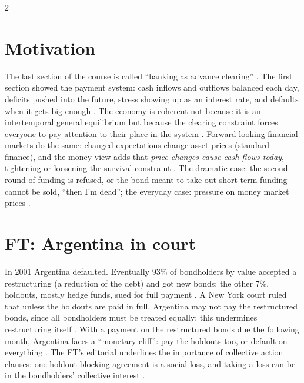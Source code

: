 \begin{paracol}{2}
\section*{Motivation}
The last section of the course is called ``banking as advance clearing'' . The first section showed the payment system: cash inflows and
outflows balanced each day, deficits pushed into the future, stress showing up as an interest rate, and defaults when it gets big enough .
The economy is coherent not because it is an intertemporal general equilibrium but because the clearing constraint forces everyone to pay attention to their place in
the system . Forward-looking financial markets do the same: changed expectations change asset prices (standard finance), and the
money view adds that \emph{price changes cause cash flows today}, tightening or loosening the survival constraint .
The dramatic case: the second round of funding is refused, or the bond meant to take out short-term funding cannot be sold, ``then I'm dead''; the everyday case:
pressure on money market prices .

\section{FT: Argentina in court}\label{sec:ff-ft-argentina}

\begin{casestudy}
In 2001 Argentina defaulted. Eventually 93\% of bondholders by value accepted a restructuring (a reduction of the debt) and got new bonds; the other 7\%,
holdouts, mostly hedge funds, sued for full payment . A New York court ruled that unless the
holdouts are paid in full, Argentina may not pay the restructured bonds, since all bondholders must be treated equally; this undermines restructuring itself
. With a payment on the restructured bonds due the following month, Argentina faces a ``monetary cliff'': pay the
holdouts too, or default on everything . The FT's editorial underlines the importance of collective action clauses: one holdout
blocking agreement is a social loss, and taking a loss can be in the bondholders' collective interest .


\end{casestudy}
\end{paracol}
